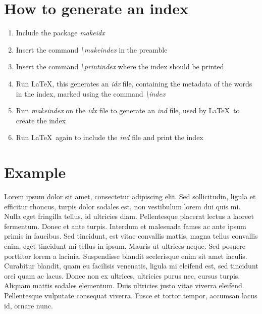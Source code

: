 \documentclass{article}
\begin{document}
	
\section*{How to generate an index}

\begin{enumerate}
	\item Include the package \emph{makeidx}
	\item Insert the command \emph{\textbackslash makeindex} in the preamble
	\item Insert the command \emph{\textbackslash printindex} where the index should be printed
	\item Run \LaTeX, this generates an \emph{idx} file, containing the metadata of the words in the index, marked using the command \emph{\textbackslash index}
	\item Run \emph{makeindex} on the \emph{idx} file to generate an \emph{ind} file, used by \LaTeX\ to create the index
	\item Run \LaTeX\ again to include the \emph{ind} file and print the index
\end{enumerate}

\section*{Example}

Lorem ipsum
dolor sit amet, consectetur adipiscing elit. Sed sollicitudin, ligula et efficitur rhoncus, turpis dolor sodales est, non vestibulum lorem dui quis mi. Nulla eget fringilla tellus, id ultricies diam. Pellentesque placerat lectus a laoreet fermentum. Donec et ante turpis.
Interdum et malesuada fames ac ante ipsum primis in faucibus. Sed tincidunt, est vitae convallis mattis, magna tellus convallis enim, eget tincidunt mi tellus in ipsum. Mauris ut ultrices neque. Sed posuere porttitor lorem a lacinia.
Suspendisse blandit scelerisque enim sit amet iaculis. Curabitur blandit, quam eu facilisis venenatis, ligula mi eleifend est, sed tincidunt orci quam ac lacus. Donec non ex ultrices, ultricies purus nec, cursus turpis. Aliquam mattis sodales elementum.
Duis ultricies justo vitae viverra eleifend. Pellentesque vulputate consequat viverra. Fusce et tortor tempor, accumsan lacus id, ornare nunc.

\printindex
\end{document}

